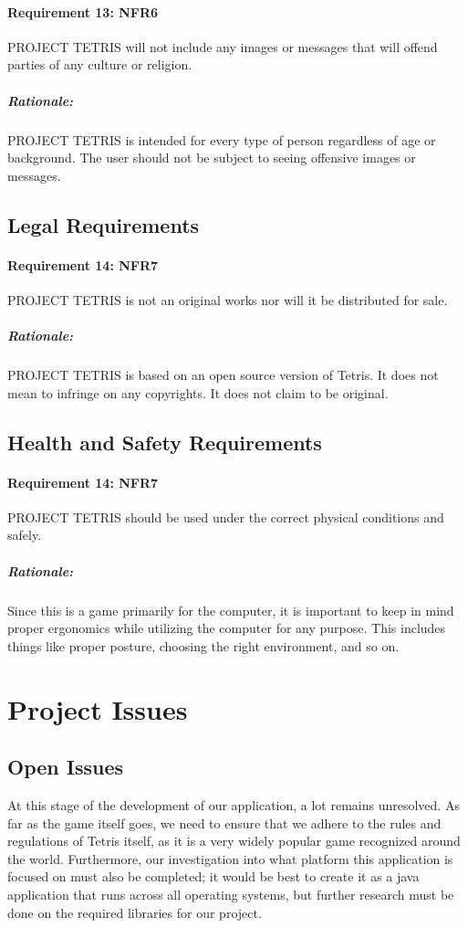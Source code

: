 \documentclass[12pt, titlepage]{article}
\begin{document}
\paragraph{Requirement 13: NFR6}
PROJECT TETRIS will not include any images or messages that will offend parties of any culture or religion.
\subparagraph{Rationale:}
PROJECT TETRIS is intended for every type of person regardless of age or background. The user should not be subject to seeing offensive images or messages.

\subsection{Legal Requirements}
\paragraph{Requirement 14: NFR7}
PROJECT TETRIS is not an original works nor will it be distributed for sale.
\subparagraph{Rationale:}
PROJECT TETRIS is based on an open source version of Tetris. It does not mean to infringe on any copyrights. It does not claim to be original.

\subsection{Health and Safety Requirements}
\paragraph{Requirement 14: NFR7}
PROJECT TETRIS should be used under the correct physical conditions and safely.\subparagraph{Rationale:}
Since this is a game primarily for the computer, it is important to keep in mind proper ergonomics while utilizing the computer for any purpose. This includes things like proper posture, choosing the right environment, and so on.


\section{Project Issues}

\subsection{Open Issues}
At this stage of the development of our application, a lot remains unresolved. As far as the game itself goes, we need to ensure that we adhere to the rules and regulations of Tetris itself, as it is a very widely popular game recognized around the world. Furthermore, our investigation into what platform this application is focused on must also be completed; it would be best to create it as a java application that runs across all operating systems, but further research must be done on the required libraries for our project.
\end{document}
